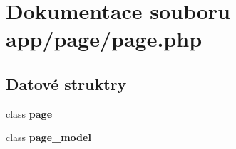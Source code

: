 \section{Dokumentace souboru app/page/page.php}
\label{db/d70/page_8php}
\subsection*{Datové struktry}
\begin{DoxyCompactItemize}
\item 
class {\bf page}
\item 
class {\bf page\_\-model}
\end{DoxyCompactItemize}
